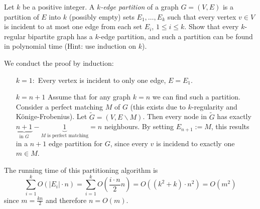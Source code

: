 \documentclass{article}
\begin{document}
\begin{exercise}
    Let $k$ be a positive integer. A \textit{$k$-edge partition} of a graph $G =(V,E)$ is a partition of $E$ into $k$ (possibly empty) sets $E_1,\dots, E_k$ such that every vertex $v\in V$ is incident to at most one edge from each set $E_i$, $1\leq i\leq k$. Show that every $k$-regular bipartite graph has a $k$-edge partition, and such a partition can be found in polynomial time (Hint: use induction on $k$).
\end{exercise}
\begin{solving}
    We conduct the proof by induction:\begin{enumerate}
        \item[$k=1:$] Every vertex is incident to only one edge, $E = E_1$.
        \item[$k = n+1$] Assume that for any graph $k=n$ we can find such a partition. Consider a perfect matching $M$ of $G$ (this exists due to $k$-regularity and Könige-Frobenius). Let $\tilde G = (V,E\backslash M)$. Then every node in $\tilde G$ has exactly $\underbrace{n+1}_{\text{in } G}-\underbrace{1}_{M \text{ is perfect matching}} = n$ neighbours. By setting $E_{n+1}:= M$, this results in a $n+1$ edge partition for $G$, since every $v$ is incidend to exactly one $m\in M$.
    \end{enumerate}
The running time of this partitioning algorithm is \begin{equation*}
    \sum_{i=1}^k O(|E_i|\cdot n) = \sum_{i=1}^k O (\frac{i\cdot n}2 n) = O ((k^2+k)\cdot n^2) = O(m^2)
\end{equation*} since $m = \frac{kn}2$ and therefore $n = O(m)$.
\end{solving}
\end{document}
